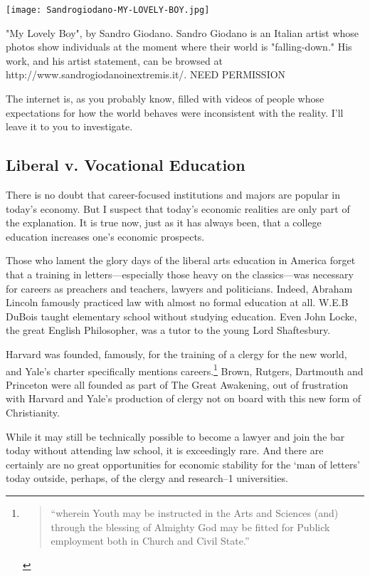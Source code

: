 \begin{marginfigure}\texttt{[image: Sandrogiodano-MY-LOVELY-BOY.jpg]}\caption{"My Lovely Boy", by Sandro Giodano. Sandro Giodano is an Italian artist whose photos show individuals at the moment where their world is "falling-down." His work, and his artist statement, can be browsed at http://www.sandrogiodanoinextremis.it/. NEED PERMISSION}\label{fig:giodano}\end{marginfigure} The internet is, as you probably know, filled with videos of people whose expectations for how the world behaves were inconsistent with the reality. I'll leave it to you to investigate.

\subsection{Liberal v. Vocational Education}
\label{liberalv.vocationaleducation}

There is no doubt that career-focused institutions and majors are popular in today's economy. But I suspect that today's economic realities are only part of the explanation. It is true now, just as it has always been, that a college education increases one's economic prospects. 

Those who lament the glory days of the liberal arts education in America forget that a training in letters---especially those heavy on the classics---was necessary for careers as preachers and teachers, lawyers and politicians. Indeed, Abraham Lincoln famously practiced law with almost no formal education at all. W.E.B DuBois taught elementary school without studying education. Even John Locke, the great English Philosopher, was a tutor to the young Lord Shaftesbury.

Harvard was founded, famously, for the training of a clergy for the new world, and Yale's charter specifically mentions careers.\footnote{\begin{quote}

``wherein Youth may be instructed in the Arts and Sciences (and) through the blessing of Almighty God may be fitted for Publick employment both in Church and Civil State.''
\end{quote}} Brown, Rutgers, Dartmouth and Princeton were all founded as part of The Great Awakening, out of frustration with Harvard and Yale's production of clergy not on board with this new form of Christianity. 

While it may still be technically possible to become a lawyer and join the bar today without attending law school, it is exceedingly rare. And there are certainly are no great opportunities for economic stability for the `man of letters' today outside, perhaps, of the clergy and research--1 universities. 

